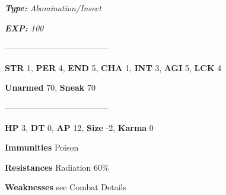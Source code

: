 \documentclass[11pt,a4paper,twocolumn]{book}
\begin{document}
	\noindent
	\emph{\textbf{Type:} Abomination/Insect}
	
	\noindent
	\emph{\textbf{EXP:} 100}
	
%		
%	
%		

	--------------------------------------
	
	\noindent
	\textbf{STR} 1, \textbf{PER} 4, \textbf{END} 5, \textbf{CHA} 1, \textbf{INT} 3, \textbf{AGI} 5, \textbf{LCK} 4
	
	\noindent
	\textbf{Unarmed} 70, \textbf{Sneak} 70
	
	--------------------------------------
	
	\noindent
	\textbf{HP} 3, \textbf{DT} 0, \textbf{AP} 12, \textbf{Size} -2, \textbf{Karma} 0
	
	
	\noindent
	\textbf{Immunities} Poison
	
	\noindent
	\textbf{Resistances} Radiation 60\%
	
	\noindent
	\textbf{Weaknesses} see Combat Details %
	
\end{document}
